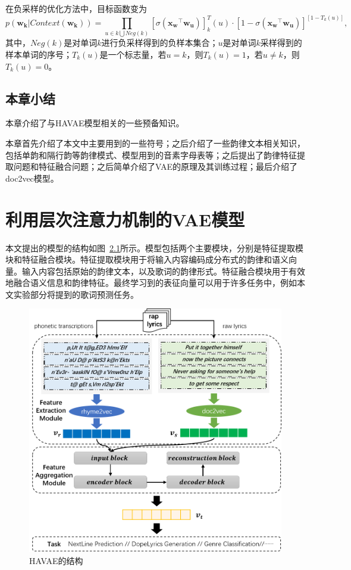 在负采样的优化方法中，目标函数变为
\begin{equation}
\label{eq:neg}
p(\bm {w_k}|Context(\bm {w_k})) = \prod_{u\in {k}\bigcup Neg(k)}{[\sigma(\bm{x_w}^\top \bm{w_u})]^T_k(u)\cdot{[1-\sigma(\bm{x_w}^\top \bm{w_u})]^{[1-T_k(u)]}}},
\end{equation}
其中，$Neg(k)$是对单词$k$进行负采样得到的负样本集合；$u$是对单词$k$采样得到的样本单词的序号；$T_k(u)$是一个标志量，若$u=k$，则$T_k(u)=1$，若$u\ne k$，则$T_k(u)=0$。

\section{本章小结}
本章介绍了与HAVAE模型相关的一些预备知识。\par
本章首先介绍了本文中主要用到的一些符号；之后介绍了一些韵律文本相关知识，包括单韵和隔行韵等韵律模式、模型用到的音素字母表等；之后提出了韵律特征提取问题和特征融合问题；之后简单介绍了VAE的原理及其训练过程；最后介绍了doc2vec模型。\par

\chapter{利用层次注意力机制的VAE模型} \label{chpt:model}

本文提出的模型的结构如图~\ref{fig:model}所示。模型包括两个主要模块，分别是特征提取模块和特征融合模块。特征提取模块用于将输入内容编码成分布式的韵律和语义向量。输入内容包括原始的韵律文本，以及歌词的韵律形式。特征融合模块用于有效地融合语义信息和韵律特征。最终学习到的表征向量可以用于许多任务中，例如本文实验部分将提到的歌词预测任务。\par
\begin{figure}[h]
  \centering 
  \includegraphics[width=12cm]{model.png}
  \caption{HAVAE的结构}
  \label{fig:model}
\end{figure}

